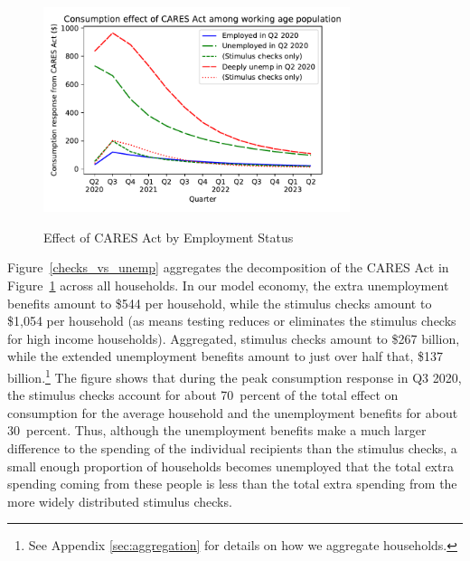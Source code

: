 \documentclass[titlepage,letterpaper]{\econtex}
\begin{document}
\begin{figure}
  \centering
  \caption{Effect of CARES Act by Employment Status}
  \label{stim_by_emp}
  { \includegraphics[width=0.8\textwidth]{./Figures/ConDeltaByEmpState}}
\end{figure}

Figure~\ref{checks_vs_unemp} aggregates the decomposition of the CARES Act in Figure~\ref{stim_by_emp} across all households.
In our model economy, the extra unemployment benefits amount to \$544 per household, while the stimulus checks amount to \$1,054 per household (as means testing reduces or eliminates the stimulus checks for high income households).
Aggregated, stimulus checks amount to \$267 billion, while the extended unemployment benefits amount to just over half that, \$137 billion.\footnote{See Appendix \ref{sec:aggregation} for details on how we aggregate households.}
The figure shows that during the peak consumption response in Q3 2020, the stimulus checks account for about 70~percent of the total effect on consumption for the average household and the unemployment benefits for about 30~percent.  Thus, although the unemployment benefits make a much larger difference to the spending of the individual recipients than the stimulus checks, a small enough proportion of households becomes unemployed that the total extra spending coming from these people is less than the total extra spending from the more widely distributed stimulus checks.
\end{document}
